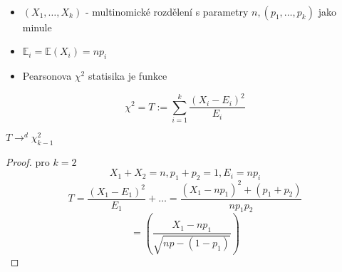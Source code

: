 \documentclass[../main.tex]{subfiles}
\begin{document}
\begin{definition}\
    \begin{itemize}
        \item $(X_1,\dots,X_k)$ - multinomické rozdělení s parametry $n, (p_1,\dots,p_k)$ jako minule
        \item $\mathbb{E}_i = \mathbb{E}(X_i) = np_i$
        \item Pearsonova $\chi^2$ statisika je funkce
    \end{itemize}
    \[\chi^2 = T:= \sum^k_{i=1} \frac{(X_i - E_i)^2}{E_i}\]
\end{definition}


\begin{theorem}
    $T \rightarrow^d \chi^2_{k-1}$
\end{theorem}
\begin{proof}
    pro $k=2$
    \[X_1 + X_2 = n, p_1 + p_2 = 1, E_i = np_i\]
    \[T = \frac{(X_1 - E_1)^2}{E_1} + \dots = \frac{(X_1 - np_1)^2 + (p_1 + p_2)}{np_1p_2}\]
    \[ = \left(\frac{X_1 - np_1}{\sqrt{np - (1-p_1)}}\right)\]
\end{proof}
\end{document}

